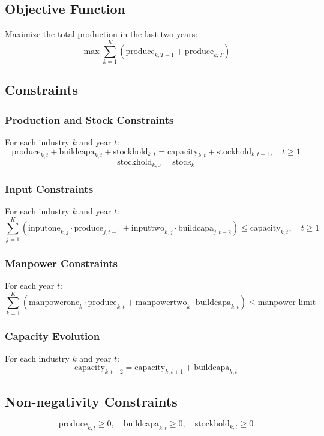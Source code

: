 \documentclass{article}
\begin{document}
\subsection*{Objective Function}
Maximize the total production in the last two years:
\[
\max \sum_{k=1}^{K} \left( \text{produce}_{k, T-1} + \text{produce}_{k, T} \right)
\]

\subsection*{Constraints}

\subsubsection*{Production and Stock Constraints}
For each industry $k$ and year $t$:
\[
\text{produce}_{k, t} + \text{buildcapa}_{k, t} + \text{stockhold}_{k, t} = \text{capacity}_{k, t} + \text{stockhold}_{k, t-1}, \quad t \geq 1
\]
\[
\text{stockhold}_{k, 0} = \text{stock}_{k}
\]

\subsubsection*{Input Constraints}
For each industry $k$ and year $t$:
\[
\sum_{j=1}^{K} \left( \text{inputone}_{k, j} \cdot \text{produce}_{j, t-1} + \text{inputtwo}_{k, j} \cdot \text{buildcapa}_{j, t-2} \right) \leq \text{capacity}_{k, t}, \quad t \geq 1
\]

\subsubsection*{Manpower Constraints}
For each year $t$:
\[
\sum_{k=1}^{K} \left( \text{manpowerone}_{k} \cdot \text{produce}_{k, t} + \text{manpowertwo}_{k} \cdot \text{buildcapa}_{k, t} \right) \leq \text{manpower\_limit}
\]

\subsubsection*{Capacity Evolution}
For each industry $k$ and year $t$:
\[
\text{capacity}_{k, t+2} = \text{capacity}_{k, t+1} + \text{buildcapa}_{k, t}
\]

\subsection*{Non-negativity Constraints}
\[
\text{produce}_{k, t} \geq 0, \quad \text{buildcapa}_{k, t} \geq 0, \quad \text{stockhold}_{k, t} \geq 0
\]
\end{document}
